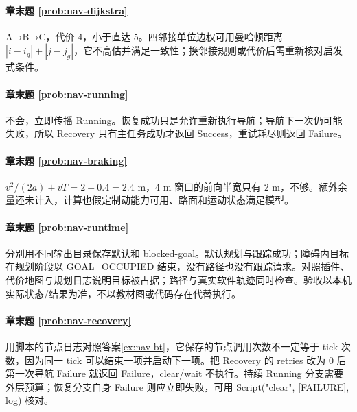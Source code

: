 \paragraph*{章末题 \ref{prob:nav-dijkstra}}
\begin{solution}
A→B→C，代价 4，小于直达 5。四邻接单位边权可用曼哈顿距离 $|i-i_g|+|j-j_g|$，它不高估并满足一致性；换邻接规则或代价后需重新核对启发式条件。
\end{solution}

\paragraph*{章末题 \ref{prob:nav-running}}
\begin{solution}
不会，立即传播 Running。恢复成功只是允许重新执行导航；导航下一次仍可能失败，所以 Recovery 只有主任务成功才返回 Success，重试耗尽则返回 Failure。
\end{solution}

\paragraph*{章末题 \ref{prob:nav-braking}}
\begin{solution}
$v^2/(2a)+vT=2+0.4=2.4$ m，4 m 窗口的前向半宽只有 2 m，不够。额外余量还未计入，计算也假定制动能力可用、路面和运动状态满足模型。
\end{solution}

\paragraph*{章末题 \ref{prob:nav-runtime}}
\begin{solution}
分别用不同输出目录保存默认和 blocked-goal。默认规划与跟踪成功；障碍内目标在规划阶段以 GOAL\_OCCUPIED 结束，没有路径也没有跟踪请求。对照插件、代价地图与规划日志说明目标被占据；路径与真实软件轨迹同时检查。验收以本机实际状态/结果为准，不以教材图或代码存在代替执行。
\end{solution}

\paragraph*{章末题 \ref{prob:nav-recovery}}
\begin{solution}
用脚本的节点日志对照答案\ref{ex:nav-bt}，它保存的节点调用次数不一定等于 tick 次数，因为同一 tick 可以结束一项并启动下一项。把 Recovery 的 retries 改为 0 后第一次导航 Failure 就返回 Failure，clear/wait 不执行。持续 Running 分支需要外层预算；恢复分支自身 Failure 则应立即失败，可用 Script("clear", [FAILURE], log) 核对。
\end{solution}

\endgroup
